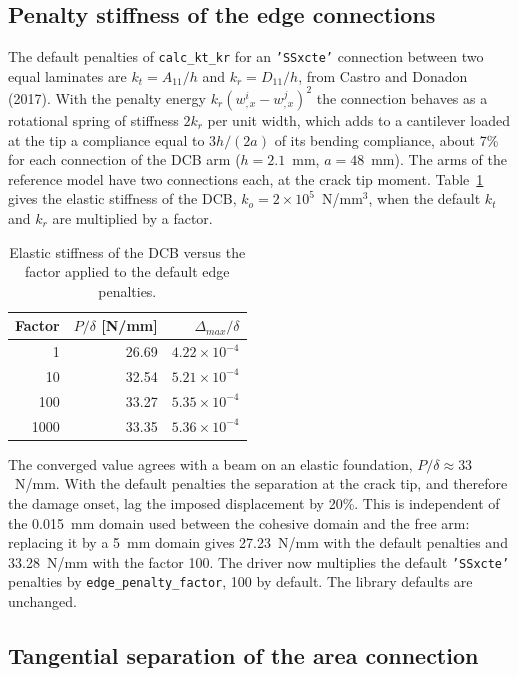 \subsection{Penalty stiffness of the edge connections}\label{sec:cz-dev-edge-penalty}

The default penalties of \texttt{calc\_kt\_kr} for an \texttt{'SSxcte'} connection between two equal laminates are $k_t = A_{11}/h$ and $k_r = D_{11}/h$, from Castro and Donadon (2017). With the penalty energy $k_r (w^i_{,x} - w^j_{,x})^2$ the connection behaves as a rotational spring of stiffness $2 k_r$ per unit width, which adds to a cantilever loaded at the tip a compliance equal to $3h/(2a)$ of its bending compliance, about 7\% for each connection of the DCB arm ($h = 2.1$~mm, $a = 48$~mm). The arms of the reference model have two connections each, at the crack tip moment. Table~\ref{tab:cz-dev-edge-penalty} gives the elastic stiffness of the DCB, $k_o = 2\times10^5$~N/mm$^3$, when the default $k_t$ and $k_r$ are multiplied by a factor.

\begin{table}[!htbp]
	\centering
	\caption[]{Elastic stiffness of the DCB versus the factor applied to the default edge penalties.}
	\label{tab:cz-dev-edge-penalty}
	\renewcommand{\arraystretch}{1.3}
	\begin{tabular}{rrr}
		\toprule
		Factor & $P/\delta$ [N/mm] & $\Delta_{max}/\delta$ \\
		\midrule
		1 & 26.69 & $4.22\times10^{-4}$ \\
		10 & 32.54 & $5.21\times10^{-4}$ \\
		100 & 33.27 & $5.35\times10^{-4}$ \\
		1000 & 33.35 & $5.36\times10^{-4}$ \\
		\bottomrule
	\end{tabular}
\end{table}

The converged value agrees with a beam on an elastic foundation, $P/\delta \approx 33$~N/mm. With the default penalties the separation at the crack tip, and therefore the damage onset, lag the imposed displacement by 20\%. This is independent of the 0.015~mm domain used between the cohesive domain and the free arm: replacing it by a 5~mm domain gives 27.23~N/mm with the default penalties and 33.28~N/mm with the factor 100. The driver now multiplies the default \texttt{'SSxcte'} penalties by \texttt{edge\_penalty\_factor}, 100 by default. The library defaults are unchanged.

\subsection{Tangential separation of the area connection}\label{sec:cz-dev-kinematics}

